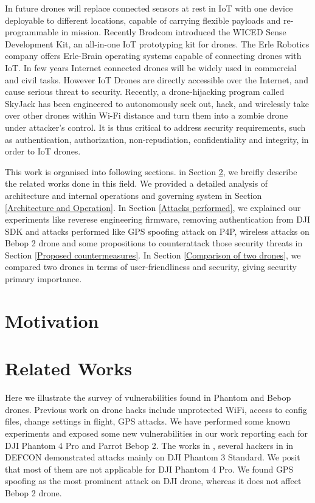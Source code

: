 \documentclass[conference]{IEEEtran}
\begin{document}
In future drones will replace connected sensors at rest in IoT with one device deployable to different locations, capable of carrying flexible payloads and re-programmable in mission. Recently Brodcom introduced the WICED Sense Development Kit, an all-in-one IoT prototyping kit for drones. The Erle Robotics company offers Erle-Brain operating systems capable of connecting drones with IoT. 
In few years Internet connected drones will be widely used in commercial and civil tasks. 
However IoT Drones are directly accessible over the Internet, and cause serious threat to security. 
Recently, a drone-hijacking program called SkyJack has been engineered to 
autonomously seek out, hack, and wirelessly take over other drones within Wi-Fi distance and turn them into a zombie drone under attacker’s control.
It is thus critical to address security requirements, such as authentication, authorization, non-repudiation, confidentiality and integrity, in order to IoT drones. 

This work is organised into following sections. in Section \ref{Related Works}, we breifly describe the related works done in this field. We provided a detailed analysis of architecture and internal operations and governing system in Section \ref{Architecture and Operation}. In Section \ref{Attacks performed}, we explained our experiments like reverese engineering firmware, removing authentication from DJI SDK and attacks performed like GPS spoofing attack on P4P, wireless attacks on Bebop 2 drone and some propositions to counterattack those security threats in Section \ref{Proposed countermeasures}. In Section \ref{Comparison of two drones}, we compared two drones in terms of user-friendliness and security, giving security primary importance. 
\section{Motivation}

\section{Related Works}\label{Related Works}
Here we illustrate the survey of vulnerabilities found in Phantom and Bebop drones. Previous work on drone hacks include unprotected WiFi, access to config files, change settings in flight, GPS attacks. We have performed some known experiments and exposed some new vulnerabilities in our work reporting each for DJI Phantom 4 Pro and Parrot Bebop 2. 
The works in \cite{mit9}, several hackers in \cite{ROB:ROB21513} in DEFCON demonstrated attacks mainly on DJI Phantom 3 Standard. We posit that most of them are not applicable for DJI Phantom 4 Pro. We found GPS spoofing as the most prominent attack on DJI drone, whereas it does not affect Bebop 2 drone.
 
\end{document}
